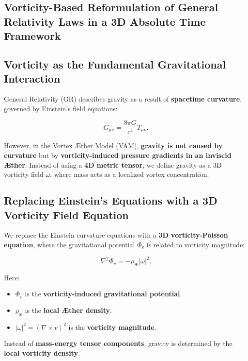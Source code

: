 \documentclass[preprint]{revtex4-2}
\begin{document}
    \subsection{Vorticity-Based Reformulation of General Relativity Laws in a 3D Absolute Time Framework}

    \subsection*{Vorticity as the Fundamental Gravitational Interaction}

    General Relativity (GR) describes gravity as a result of \textbf{spacetime curvature}, governed by Einstein's field equations:

    \begin{equation*}
        G_{\mu\nu} = \frac{8\pi G}{c^4} T_{\mu\nu}.
    \end{equation*}

    However, in the Vortex Æther Model (VAM), \textbf{gravity is not caused by curvature} but by \textbf{vorticity-induced pressure gradients in an inviscid Æther}. Instead of using a \textbf{4D metric tensor}, we define gravity as a 3D vorticity field \( \omega \), where mass acts as a localized vortex concentration.

    \subsection*{Replacing Einstein's Equations with a 3D Vorticity Field Equation}

    We replace the Einstein curvature equations with a \textbf{3D vorticity-Poisson equation}, where the gravitational potential \( \Phi_v \) is related to vorticity magnitude:

    \begin{equation*}
        \nabla^2 \Phi_v = - \rho_\text{Æ} |\omega|^2.
    \end{equation*}

    Here:
    \begin{itemize}
        \item  \( \Phi_v \) is the \textbf{vorticity-induced gravitational potential}.
        \item  \( \rho_\text{\ae} \) is the \textbf{local Æther density}.
        \item  \( |\omega|^2 = (\nabla \times v)^2 \) is the \textbf{vorticity magnitude}.
    \end{itemize}

    Instead of \textbf{mass-energy tensor components}, gravity is determined by the \textbf{local vorticity density}.
\end{document}
